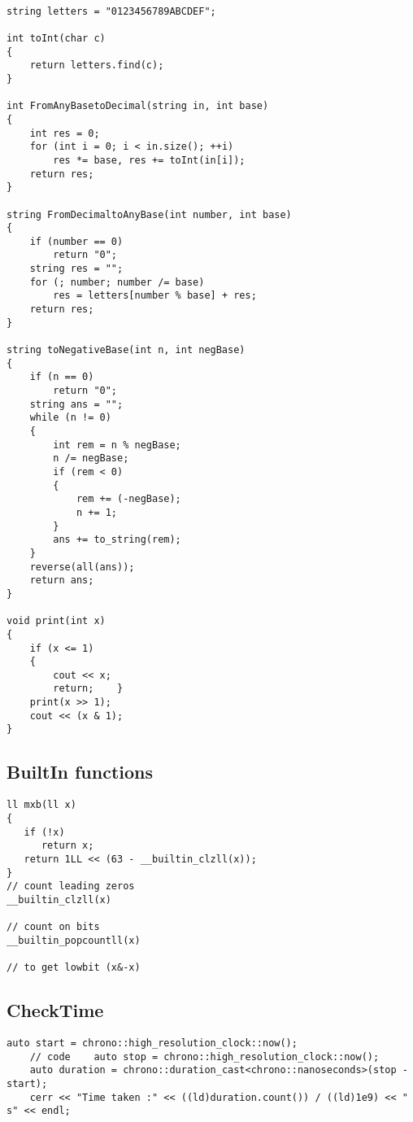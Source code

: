 {\begin{lstlisting}[style=cpp]
  
string letters = "0123456789ABCDEF";  
  
int toInt(char c)  
{  
    return letters.find(c);  
}  
  
int FromAnyBasetoDecimal(string in, int base)  
{  
    int res = 0;  
    for (int i = 0; i < in.size(); ++i)  
        res *= base, res += toInt(in[i]);  
    return res;  
}  
  
string FromDecimaltoAnyBase(int number, int base)  
{  
    if (number == 0)  
        return "0";  
    string res = "";  
    for (; number; number /= base)  
        res = letters[number % base] + res;  
    return res;  
}  
  
string toNegativeBase(int n, int negBase)  
{  
    if (n == 0)  
        return "0";  
    string ans = "";  
    while (n != 0)  
    {  
        int rem = n % negBase;  
        n /= negBase;  
        if (rem < 0)  
        {  
            rem += (-negBase);  
            n += 1;  
        }  
        ans += to_string(rem);  
    }  
    reverse(all(ans));  
    return ans;  
}  
  
void print(int x)  
{  
    if (x <= 1)  
    {  
        cout << x;  
        return;    }  
    print(x >> 1);  
    cout << (x & 1);  
}
\end{lstlisting}

\subsection{BuiltIn functions}

\begin{lstlisting}[style=cpp]
ll mxb(ll x)  
{  
   if (!x)  
      return x;  
   return 1LL << (63 - __builtin_clzll(x));  
}
// count leading zeros
__builtin_clzll(x)

// count on bits 
__builtin_popcountll(x)

// to get lowbit (x&-x)
\end{lstlisting}

\subsection{CheckTime}

\begin{lstlisting}[style=cpp]
	auto start = chrono::high_resolution_clock::now();  
	// code    auto stop = chrono::high_resolution_clock::now();  
	auto duration = chrono::duration_cast<chrono::nanoseconds>(stop - start);  
	cerr << "Time taken :" << ((ld)duration.count()) / ((ld)1e9) << " s" << endl;
\end{lstlisting}

}
